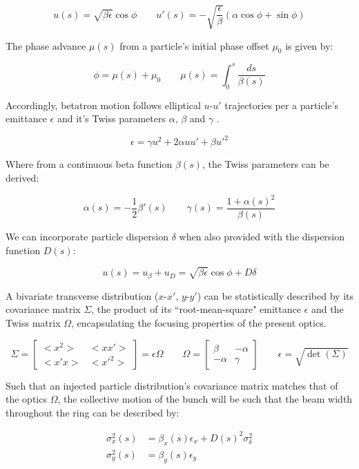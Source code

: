 \begin{equation}
    u(s)=\sqrt{\beta\epsilon}\cos\phi \qquad u'(s)=-\sqrt{\frac{\epsilon}{\beta}}(\alpha\cos\phi+\sin\phi)
    \label{eq:hills_equations}
\end{equation}

The phase advance $\mu(s)$ from a particle's initial phase offset $\mu_0$ is given by:

$$\phi = \mu(s) + \mu_0 \qquad \mu(s) = \int_0^s\frac{ds}{\beta(s)}$$

Accordingly, betatron motion follows elliptical $u$-$u'$ trajectories per a particle's emittance $\epsilon$ and it's Twiss parameters $\alpha$, $\beta$ and $\gamma$ \cite{courant_theory_1958}.

$$\epsilon = \gamma u^2 + 2 \alpha u u' + \beta u'^2$$

Where from a continuous beta function $\beta(s)$, the Twiss parameters can be derived:

$$\alpha(s) = -\frac{1}{2}\beta'(s) \qquad \gamma(s) = \frac{1+\alpha(s)^2}{\beta(s)}$$

We can incorporate particle dispersion $\delta$ when also provided with the dispersion function $D(s)$:

$$u(s) = u_\beta + u_D= \sqrt{\beta\epsilon}\cos\phi + D\delta$$

A bivariate transverse distribution ($x$-$x'$, $y$-$y'$) can be statistically described by its covariance matrix $\Sigma$, the product of its ``root-mean-square" emittance $\epsilon$ and the Twiss matrix $\Omega$, encapsulating the focusing properties of the present optics.

$$\Sigma = \begin{bmatrix}<x^2> & <xx'> \\ <x'x>& <x'^2>\end{bmatrix} = \epsilon\Omega \qquad \Omega = \begin{bmatrix}\beta &-\alpha \\ -\alpha & \gamma\end{bmatrix} \qquad \epsilon = \sqrt{\det(\Sigma)}$$

Such that an injected particle distribution's covariance matrix matches that of the optics $\Omega$, the collective motion of the bunch will be such that the beam width throughout the ring can be described by:

$$\begin{aligned}
        \sigma^2_x(s) & = \beta_x(s)\epsilon_x+D(s)^2\sigma_\delta^2 \\
        \sigma^2_y(s) & = \beta_y(s)\epsilon_y
    \end{aligned}$$

